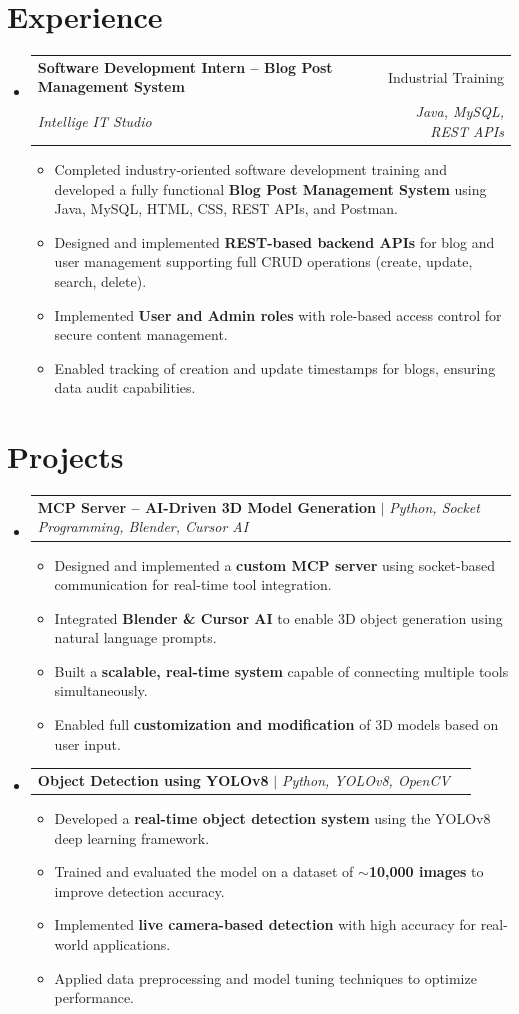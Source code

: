 \documentclass[a4paper,11pt]{extarticle}
\makeatletter
\newcommand{\resumeSubheading}[4]{
  \vspace{-2pt}\item
    \begin{tabular*}{0.97\textwidth}[t]{l@{\extracolsep{\fill}}r}
      \textbf{#1} & #2 \\
      \textit{\small #3} & \textit{\small #4} \\
    \end{tabular*}\vspace{-6pt}
}
\newcommand{\resumeProjectHeading}[2]{
    \item
    \begin{tabular*}{0.97\textwidth}{l@{\extracolsep{\fill}}r}
      \small #1 & #2 \\
    \end{tabular*}\vspace{-7pt}
}
\newcommand{\resumeItemPlain}[1]{
  \item\small{#1 \vspace{-2pt}}
}
\newcommand{\resumeSubHeadingListStart}{\begin{itemize}[leftmargin=0.15in, label={}]}
\newcommand{\resumeSubHeadingListEnd}{\end{itemize}}
\newcommand{\resumeItemListStart}{\begin{itemize}}
\newcommand{\resumeItemListEnd}{\end{itemize}\vspace{-5pt}}
\makeatother
\begin{document}
\section{Experience}
  \resumeSubHeadingListStart
    \resumeSubheading
      {Software Development Intern -- Blog Post Management System}{Industrial Training}
      {Intellige IT Studio}{Java, MySQL, REST APIs}
      \resumeItemListStart
        \resumeItemPlain{Completed industry-oriented software development training and developed a fully functional \textbf{Blog Post Management System} using Java, MySQL, HTML, CSS, REST APIs, and Postman.}
        \resumeItemPlain{Designed and implemented \textbf{REST-based backend APIs} for blog and user management supporting full CRUD operations (create, update, search, delete).}
        \resumeItemPlain{Implemented \textbf{User and Admin roles} with role-based access control for secure content management.}
        \resumeItemPlain{Enabled tracking of creation and update timestamps for blogs, ensuring data audit capabilities.}
      \resumeItemListEnd
  \resumeSubHeadingListEnd

\section{Projects}
  \resumeSubHeadingListStart
    \resumeProjectHeading
      {\textbf{MCP Server -- AI-Driven 3D Model Generation} $|$ \emph{Python, Socket Programming, Blender, Cursor AI}}{}
      \resumeItemListStart
        \resumeItemPlain{Designed and implemented a \textbf{custom MCP server} using socket-based communication for real-time tool integration.}
        \resumeItemPlain{Integrated \textbf{Blender \& Cursor AI} to enable 3D object generation using natural language prompts.}
        \resumeItemPlain{Built a \textbf{scalable, real-time system} capable of connecting multiple tools simultaneously.}
        \resumeItemPlain{Enabled full \textbf{customization and modification} of 3D models based on user input.}
      \resumeItemListEnd
    \resumeProjectHeading
      {\textbf{Object Detection using YOLOv8} $|$ \emph{Python, YOLOv8, OpenCV}}{}
      \resumeItemListStart
        \resumeItemPlain{Developed a \textbf{real-time object detection system} using the YOLOv8 deep learning framework.}
        \resumeItemPlain{Trained and evaluated the model on a dataset of \textbf{$\sim$10,000 images} to improve detection accuracy.}
        \resumeItemPlain{Implemented \textbf{live camera-based detection} with high accuracy for real-world applications.}
        \resumeItemPlain{Applied data preprocessing and model tuning techniques to optimize performance.}
      \resumeItemListEnd
  \resumeSubHeadingListEnd
\end{document}
